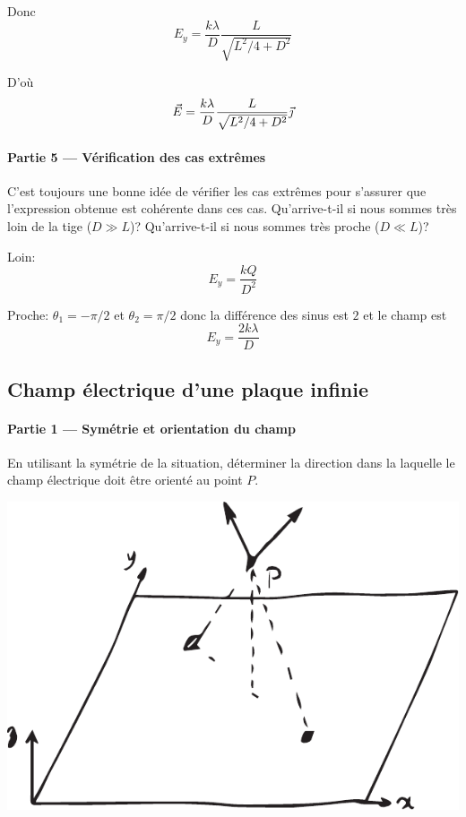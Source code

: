 Donc
\[
  E_y = \frac{k \lambda}{D}\frac{L}{\sqrt{L^2/4 + D^2}}
\]

D'où
$$\vec{E} = \frac{k \lambda}{D}\frac{L}{\sqrt{L^2/4 + D^2}}\vec{\jmath}$$


\paragraph{Partie 5 --- Vérification des cas extrêmes}

C'est toujours une bonne idée de vérifier les cas extrêmes pour s'assurer que
l'expression obtenue est cohérente dans ces cas. Qu'arrive-t-il si nous sommes
très loin de la tige ($D \gg L$)? Qu'arrive-t-il si nous sommes très proche
($D \ll L$)?

Loin:
\[
  E_y = \frac{k Q}{D^2}
\]

Proche: $\theta_1 = -\pi/2$ et $\theta_2 = \pi/2$ donc la différence des sinus
est $2$ et le champ est
\[
  E_y = \frac{2k\lambda}{D}
\]


\subsection*{Champ électrique d'une plaque infinie}

\paragraph{Partie 1 --- Symétrie et orientation du champ}

En utilisant la symétrie de la situation, déterminer la direction dans la
laquelle le champ électrique doit être orienté au point $P$.

\begin{center}
  \includegraphics[scale=0.5]{02-champ-electrique/figures/champ-plaque-uniforme-1.pdf}
\end{center}


